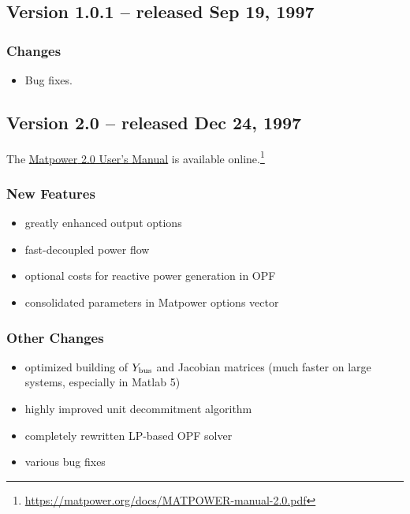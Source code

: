 \documentclass[12pt]{article}
\newcommand{\matlab}[0]{{\sc Matlab}}
\newcommand{\matpower}[0]{{\sc Matpower}}
\numberwithin{equation}{section}
\numberwithin{table}{section}
\numberwithin{figure}{section}
\begin{document}
\begin{appendices}
\subsection{Version 1.0.1 -- released Sep 19, 1997}
\label{app:v101}

\subsubsection*{Changes}
\begin{itemize}
\item Bug fixes.
\end{itemize}

\clearpage
\subsection{Version 2.0 -- released Dec 24, 1997}
\label{app:v20}

The \href{https://matpower.org/docs/MATPOWER-manual-2.0.pdf}{\matpower{} 2.0 User's Manual} is available online.\footnote{\url{https://matpower.org/docs/MATPOWER-manual-2.0.pdf}}

\subsubsection*{New Features}
\begin{itemize}
\item greatly enhanced output options
\item fast-decoupled power flow
\item optional costs for reactive power generation in OPF
\item consolidated parameters in \matpower{} options vector
\end{itemize}

\subsubsection*{Other Changes}
\begin{itemize}
\item optimized building of $Y_{\rm bus}$ and Jacobian matrices (much faster on large systems, especially in \matlab{} 5)
\item highly improved unit decommitment algorithm
\item completely rewritten LP-based OPF solver
\item various bug fixes
\end{itemize}

\clearpage

\end{appendices}
\end{document}
